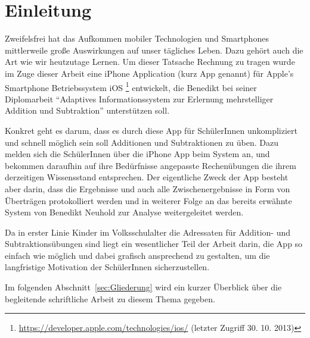 

\chapter{Einleitung}

Zweifelsfrei hat das Aufkommen mobiler Technologien und Smartphones mittlerweile große 
Auswirkungen auf unser tägliches Leben. Dazu gehört auch die Art wie wir heutzutage
Lernen. 
Um dieser Tatsache Rechnung zu tragen wurde im Zuge dieser Arbeit eine iPhone Application (kurz App genannt)  für Apple's 
Smartphone Betriebssystem iOS \footnote{\url{https://developer.apple.com/technologies/ios/} (letzter Zugriff 30. 10. 2013)} entwickelt, die Benedikt \citeauthor{Neuhold2013} bei seiner Diplomarbeit \enquote{Adaptives Informationssystem zur Erlernung
mehrstelliger Addition und Subtraktion} \citep{Neuhold2013} unterstützen soll.

Konkret geht es darum, dass es durch diese App für SchülerInnen unkompliziert und schnell möglich sein soll
Additionen und Subtraktionen zu üben. Dazu melden sich die SchülerInnen über die iPhone App beim System an, und 
bekommen daraufhin auf ihre Bedürfnisse angepasste Rechenübungen die ihrem derzeitigen Wissensstand entsprechen.
Der eigentliche Zweck der App besteht aber darin, dass die Ergebnisse und auch 
alle Zwischenergebnisse in Form von Überträgen protokolliert
werden und in weiterer Folge an das bereits erwähnte System von Benedikt
Neuhold zur Analyse weitergeleitet werden.

Da in erster Linie Kinder im Volksschulalter die Adressaten für Addition- und Subtraktionsübungen sind
liegt ein wesentlicher Teil der Arbeit darin, die App so einfach wie möglich und dabei grafisch 
ansprechend zu gestalten, um die langfristige Motivation der SchülerInnen sicherzustellen.

Im folgenden Abschnitt~\ref{sec:Gliederung} wird ein kurzer Überblick über die begleitende 
schriftliche Arbeit zu diesem Thema gegeben.

